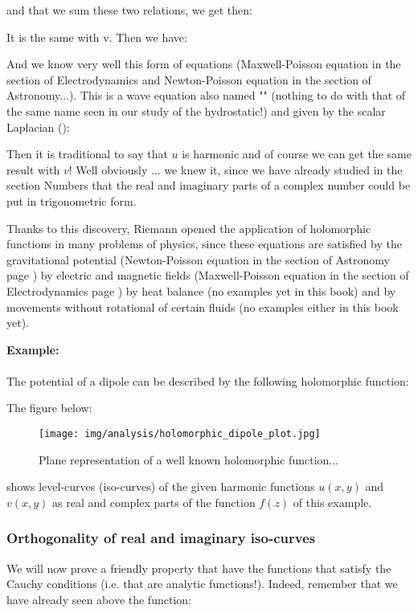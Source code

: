 	and that we sum these two relations, we get then:
	
	It is the same with v. Then we have:
	
	And we know very well this form of equations (Maxwell-Poisson equation in the section of Electrodynamics and Newton-Poisson equation in the section of Astronomy...). This is a wave equation also named "" (nothing to do with that of the same name seen in our study of the hydrostatic!) and given by the scalar Laplacian ():
	
	Then it is traditional to say that $u$ is harmonic and of course we can get the same result with $v$! Well obviously ... we knew it, since we have already studied in the section Numbers that the real and imaginary parts of a complex number could be put in trigonometric form.

	Thanks to this discovery, Riemann opened the application of holomorphic functions in many problems of physics, since these equations are satisfied by the gravitational potential (Newton-Poisson equation in the section of Astronomy page \pageref{newton-poisson equation}) by electric and magnetic fields (Maxwell-Poisson equation in the section of Electrodynamics page \pageref{maxwell-poisson equation}) by heat balance (no examples yet in this book) and by movements without rotational of certain fluids (no examples either in this book yet).

	
	\begin{tcolorbox}[colframe=black,colback=white,sharp corners]
	\textbf{{\Large {}}Example:}\\\\
	The potential of a dipole can be described by the following holomorphic function:
	
	The figure below:
	\begin{figure}[H]
		\centering
		\texttt{[image: img/analysis/holomorphic\_dipole\_plot.jpg]}
		\caption{Plane representation of a well known holomorphic function...}
	\end{figure}
	shows level-curves (iso-curves) of the given harmonic functions $u (x, y)$ and $v (x, y)$ as real and complex parts of the function $f (z)$ of this example.
	\end{tcolorbox}
	
	
	\pagebreak
	\subsubsection{Orthogonality of real and imaginary iso-curves}
	We will now prove a friendly property that have the functions that satisfy the Cauchy conditions (i.e. that are analytic functions!). Indeed, remember that we have already seen above the function:
	
